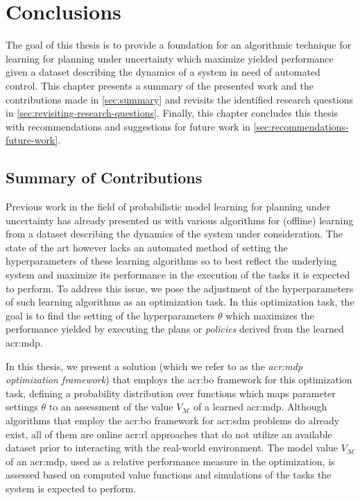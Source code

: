 \chapter{Conclusions}
\label{ch:conclusions}

The goal of this thesis is to provide a foundation for an algorithmic technique for learning  for planning under uncertainty which maximize yielded performance given a dataset describing the dynamics of a system in need of automated control.
This chapter presents a summary of the presented work and the contributions made in \autoref{sec:summary} and revisits the identified research questions in \autoref{sec:revisiting-research-questions}.
Finally, this chapter concludes this thesis with recommendations and suggestions for future work in \autoref{sec:recommendations-future-work}.%


\section{Summary of Contributions}
\label{sec:summary}

Previous work in the field of probabilistic model learning for planning under uncertainty has already presented us with various algorithms for (offline) learning  from a dataset describing the dynamics of the system under consideration.
The state of the art however lacks an automated method of setting the hyperparameters of these learning algorithms so to best reflect the underlying system and maximize its performance in the execution of the tasks it is expected to perform.
To address this issue, we pose the adjustment of the hyperparameters of such learning algorithms as an optimization task.
In this optimization task, the goal is to find the setting of the hyperparameters $\theta$ which maximizes the performance yielded by executing the plans or \textit{policies} derived from the learned \acrshort{acr:mdp}.

In this thesis, we present a solution (which we refer to as the \textit{\acrshort{acr:mdp} optimization framework}) that employs the \acrfull{acr:bo} framework for this optimization task, defining a probability distribution over functions which maps parameter settings $\theta$ to an assessment of the value $V_\mathcal{M}$ of a learned \acrshort{acr:mdp}.
Although algorithms that employ the \acrshort{acr:bo} framework for \acrshort{acr:sdm} problems do already exist, all of them are online \acrshort{acr:rl} approaches that do not utilize an available dataset prior to interacting with the real-world environment.
The model value $V_\mathcal{M}$ of an \acrshort{acr:mdp}, used as a relative performance measure in the optimization, is assessed based on computed value functions and simulations of the tasks the system is expected to perform.

